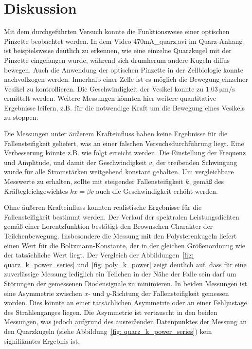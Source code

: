 \section{Diskussion}
\label{sec: diskussion}

Mit dem durchgeführten Versuch konnte die Funktionsweise einer optischen Pinzette
beobachtet werden. In dem Video 470mA\_quarz.avi im Quarz-Anhang ist beispielsweise
deutlich zu erkennen, wie eine einzelne Quarzkugel mit der Pinzette eingefangen wurde, während sich
drumherum andere Kugeln diffus bewegen. Auch die Anwendung der optischen Pinzette in der Zellbiologie
konnte nachvollzogen werden. Innerhalb einer Zelle ist es möglich die Bewegung einzelner Vesikel
zu kontrollieren. Die Geschwindigkeit der Vesikel konnte zu $\SI{1.03}{\micro\meter\per\second}$ ermittelt werden.
Weitere Messungen könnten hier weitere quantitative Ergebnisse leifern, z.B. für die
notwendige Kraft um die Bewegung eines Vesikels zu stoppen.

Die Messungen unter äußerem Krafteinfluss haben keine Ergebnisse für die Fallensteifigkeit geliefert, was
an einer falschen Versuchsdurchführung liegt.
Eine Verbesserung könnte z.B. wie folgt erreicht werden.
Die Einstellung der Frequenz und Amplitude, und
damit der Geschwindigkeit $v$, der treibenden
Schwingung wurde für alle Stromstärken weitgehend konstant gehalten. Um vergleichbare Messwerte zu erhalten,
sollte mit steigender Fallensteifigkeit $k$, gemäß des Kräftegleichgewichtes $kx = \beta v$ auch die
Geschwindigkeit erhöht werden.

Ohne äußeren Krafteinfluss konnten realistische Ergebnisse für die Fallensteifigkeit bestimmt werden. Der
Verlauf der spektralen Leistungsdichten gemäß einer Lorentzfunktion bestätigt den Brownschen Charakter der
Teilchenbewegung. Insbesondere die Messung mit den Polysterenkugeln liefert einen Wert für die Boltzmann-Konstante, der
in der gleichen Größenordnung wie der tatsächliche Wert liegt. Der Vergleich der Abbildungen~\ref{fig: quarz_k_power_series}
und~\ref{fig: poly_k_power} zeigt deutlich auf, dass für eine zuverlässige Messung lediglich ein Teilchen in der Nähe der
Falle sein darf um Störungen der gemessenen Diodensignale zu minimieren.
In beiden Messungen ist eine Asymmetrie zwischen $x$- und $y$-Richtung der Fallensteifigkeit gemessen worden. Dies könnte
an einer tatsächlichen Asymmetrie oder an einer Fehljustage des Strahlenganges liegen. Die Asymmetrie ist
vertauscht in den beiden Messungen, was jedoch aufgrund des ausreißenden Datenpunktes der Messung an den
Quarzkugeln (siehe Abbildung~\ref{fig: quarz_k_power_series}) kein signifikantes Ergebnis ist.
